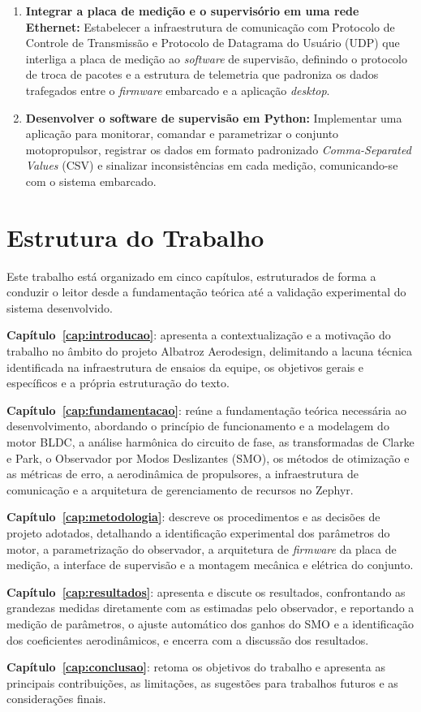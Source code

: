 \begin{enumerate}
    \item \textbf{Integrar a placa de medição e o supervisório em uma rede
    Ethernet:} Estabelecer a infraestrutura de comunicação com Protocolo de Controle de Transmissão e Protocolo de Datagrama do Usuário (UDP) que interliga
    a placa de medição ao \textit{software} de supervisão, definindo o protocolo de
    troca de pacotes e a estrutura de telemetria que padroniza os dados
    trafegados entre o \textit{firmware} embarcado e a aplicação \textit{desktop}.

    \item \textbf{Desenvolver o software de supervisão em Python:} Implementar
    uma aplicação para monitorar, comandar e parametrizar o conjunto
    motopropulsor, registrar os dados em formato padronizado \textit{Comma-Separated Values} (CSV) e sinalizar
    inconsistências em cada medição, comunicando-se com o sistema embarcado.
\end{enumerate}

\section{Estrutura do Trabalho}

Este trabalho está organizado em cinco capítulos, estruturados de forma a
conduzir o leitor desde a fundamentação teórica até a validação experimental
do sistema desenvolvido.

\textbf{Capítulo~\ref{cap:introducao}}: apresenta a contextualização e a
motivação do trabalho no âmbito do projeto Albatroz Aerodesign, delimitando a
lacuna técnica identificada na infraestrutura de ensaios da equipe, os
objetivos gerais e específicos e a própria estruturação do texto.

\textbf{Capítulo~\ref{cap:fundamentacao}}: reúne a fundamentação teórica
necessária ao desenvolvimento, abordando o princípio de funcionamento e a
modelagem do motor BLDC, a análise harmônica do circuito de fase, as
transformadas de Clarke e Park, o Observador por Modos Deslizantes (SMO), os
métodos de otimização e as métricas de erro, a aerodinâmica de propulsores, a
infraestrutura de comunicação e a arquitetura de gerenciamento de recursos no
Zephyr.

\textbf{Capítulo~\ref{cap:metodologia}}: descreve os procedimentos e as
decisões de projeto adotados, detalhando a identificação experimental dos
parâmetros do motor, a parametrização do observador, a arquitetura de
\textit{firmware} da placa de medição, a interface de supervisão e a
montagem mecânica e elétrica do conjunto.

\textbf{Capítulo~\ref{cap:resultados}}: apresenta e discute os resultados,
confrontando as grandezas medidas diretamente com as estimadas pelo
observador, e reportando a medição de parâmetros, o ajuste automático dos
ganhos do SMO e a identificação dos coeficientes aerodinâmicos, e encerra com
a discussão dos resultados.

\textbf{Capítulo~\ref{cap:conclusao}}: retoma os objetivos do trabalho e
apresenta as principais contribuições, as limitações, as sugestões para
trabalhos futuros e as considerações finais.
